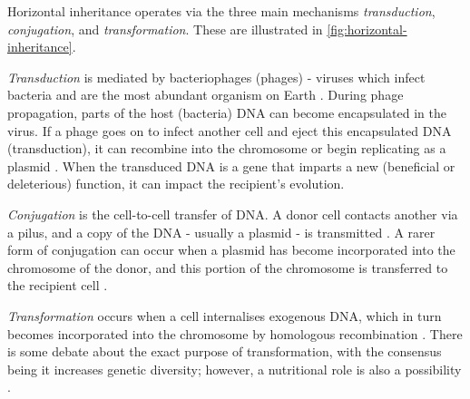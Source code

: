 Horizontal inheritance operates via the three main mechanisms \emph{transduction}, \emph{conjugation}, and \emph{transformation}. These are illustrated in \autoref{fig:horizontal-inheritance}.

\emph{Transduction} is mediated by bacteriophages (phages) - viruses which infect bacteria and are the most abundant organism on Earth \cite{mcgrath2007bacteriophage}. During phage propagation, parts of the host (bacteria) DNA can become encapsulated in the virus. If a phage goes on to infect another cell and eject this encapsulated DNA (transduction), it can recombine into the chromosome or begin replicating as a plasmid \cite{Chiang2019}. When the transduced DNA is a gene that imparts a new (beneficial or deleterious) function, it can impact the recipient's evolution.

\emph{Conjugation} is the cell-to-cell transfer of DNA. A donor cell contacts another via a pilus, and a copy of the DNA - usually a plasmid - is transmitted \cite{Soucy2015}. A rarer form of conjugation can occur when a plasmid has become incorporated into the chromosome of the donor, and this portion of the chromosome is transferred to the recipient cell \cite{Redfield2001}.

\emph{Transformation} occurs when a cell internalises exogenous DNA, which in turn becomes incorporated into the chromosome by homologous recombination \cite{Johnston2014}. There is some debate about the exact purpose of transformation, with the consensus being it increases genetic diversity; however, a nutritional role is also a possibility \cite{Johnston2014}.


